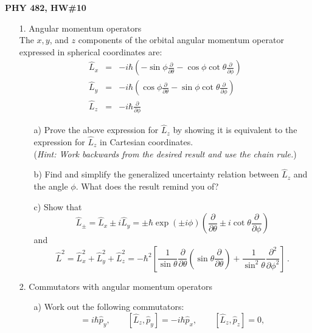 \documentclass[11pt]{article}
\begin{document}
\thispagestyle{empty}

\centerline{\bf PHY 482,  HW\#10}

\begin{itemize}
%
\item[1.] Angular momentum operators\\
The $x, y$, and $z$ components of the orbital angular momentum operator expressed in spherical coordinates are:
\begin{eqnarray*}
{\hat L}_x &=& -i\hbar \left(-\sin\phi\frac{\partial}{\partial \theta} - \cos\phi\cot\theta\frac{\partial}{\partial\phi} \right)\\
{\hat L}_y &=& -i\hbar \left(\cos\phi\frac{\partial}{\partial \theta} - \sin\phi\cot\theta\frac{\partial}{\partial\phi} \right)\\
{\hat L}_z &=& -i\hbar \frac{\partial}{\partial \phi}
\end{eqnarray*}
\begin{itemize}
\item[a)]
Prove the above expression for ${\hat L}_z$ by showing it is equivalent to the expression for ${\hat L}_z$ in Cartesian coordinates.\\
({\it Hint: Work backwards from the desired result and use the chain rule.})
\item[b)]
Find and simplify the generalized uncertainty relation between ${\hat L}_z$ and the angle $\phi$. What does the result remind you of?
\item[c)]
Show that
\begin{displaymath}
{\hat L}_{\pm} = {\hat L}_x \pm i{\hat L}_y = \pm \hbar \exp(\pm i\phi)\left(\frac{\partial}{\partial \theta}\pm i\cot\theta\frac{\partial}{\partial\phi} \right)
\end{displaymath}
and
\begin{displaymath}
{\hat L}^2 = {\hat L}_x^2 + {\hat L}_y^2 + {\hat L}_z^2 =
-\hbar^2 \left[\frac{1}{\sin\theta}\frac{\partial}{\partial\theta}\left(\sin\theta\frac{\partial}{\partial\theta}\right)+\frac{1}{\sin^2\theta}\frac{\partial^2}{\partial\phi^2}\right]\, .
\end{displaymath}
\end{itemize}
%
\vspace*{0.5cm}
%
\item[2.] Commutators with angular momentum operators
\begin{itemize}
\item[a)] Work out the following commutators:
\begin{displaymath}
[{\hat L}_z,{\hat p}_x] = i\hbar {\hat p}_y, \qquad [{\hat L}_z,{\hat p}_y] = -i\hbar {\hat p}_x, \qquad [{\hat L}_z,{\hat p}_z] = 0,

\end{displaymath}
\end{itemize}
\end{itemize}
\end{document}
